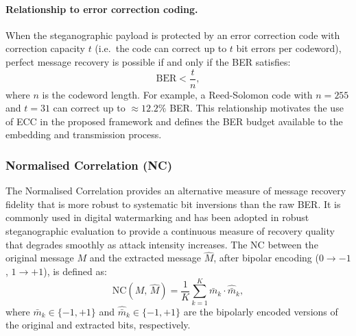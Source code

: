 \documentclass[12pt,a4paper,oneside]{report}
\begin{document}
	\paragraph{Relationship to error correction coding.}
	When the steganographic payload is protected by an error correction code with correction capacity
	$t$ (i.e.\ the code can correct up to $t$ bit errors per codeword), perfect message recovery is
	possible if and only if the BER satisfies:
	\begin{equation}
		\mathrm{BER} < \frac{t}{n},
		\label{eq:ber_ecc}
	\end{equation}
	where $n$ is the codeword length. For example, a Reed-Solomon code with $n = 255$ and
	$t = 31$ can correct up to $\approx 12.2\%$ BER. This relationship motivates the use of ECC
	in the proposed framework and defines the BER budget available to the embedding and transmission
	process.
	
%	
	\subsubsection{Normalised Correlation (NC)}
	
	The Normalised Correlation provides an alternative measure of message recovery fidelity that is
	more robust to systematic bit inversions than the raw BER. It is commonly used in digital
	watermarking \cite{cox2007digital} and has been adopted in robust steganographic evaluation to
	provide a continuous measure of recovery quality that degrades smoothly as attack intensity
	increases. The NC between the original message $M$ and the extracted message $\hat{M}$, after
	bipolar encoding ($0 \to -1$, $1 \to +1$), is defined as:
	\begin{equation}
		\mathrm{NC}(M,\, \hat{M}) = \frac{1}{K}
		\sum_{k=1}^{K} \bar{m}_k \cdot \hat{\bar{m}}_k,
		\label{eq:nc}
	\end{equation}
	where $\bar{m}_k \in \{-1, +1\}$ and $\hat{\bar{m}}_k \in \{-1, +1\}$ are the bipolarly
	encoded versions of the original and extracted bits, respectively.
	
\end{document}
